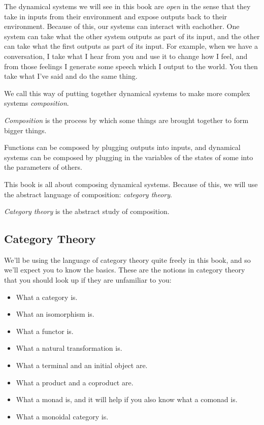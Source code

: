 \documentclass[DynamicalBook]{subfiles}
\begin{document}
The dynamical systems we will see in this book are \emph{open} in the sense that
they take in inputs from their environment and expose outputs back to their
environment. Because of this, our systems can interact with eachother. One
system can take what the other system outputs as part of its input, and the
other can take what the first outputs as part of its input. For example, when we
have a conversation, I take what I hear from you and use it to change how I
feel, and from those feelings I generate some speech which I output to the
world. You then take what I've said and do the same thing.

\begin{center}
\end{center}

We call this way of putting together dynamical systems to make more complex
systems \emph{composition}.
\begin{informal}
  \emph{Composition} is the process by which some things are brought together to
  form bigger things.
\end{informal}

Functions can be composed by plugging outputs into inputs, and dynamical systems
can be composed by plugging in the variables of the states of some into the
parameters of others.
  
This book is all about composing dynamical systems. Because of this, we will use
the abstract language of composition: \emph{category theory}.
\begin{informal}
\emph{Category theory} is the abstract study of composition.
\end{informal}




\subsection{Category Theory}

We'll be using the language of category theory quite freely in this book, and so
we'll expect you to know the basics. These are the notions in category theory that you should look up if they are unfamiliar to you:
\begin{itemize}
\item What a category is.
\item What an isomorphism is.
\item What a functor is.
\item What a natural transformation is.
\item What a terminal and an initial object are.
\item What a product and a coproduct are.
\item What a monad is, and it will help if you also know what a comonad is.
  \item What a monoidal category is.
\end{itemize}
\end{document}
